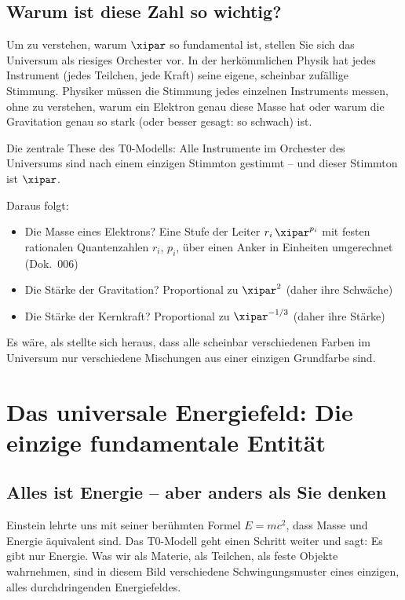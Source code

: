 	\subsection{Warum ist diese Zahl so wichtig?}
	
	Um zu verstehen, warum $\xipar$ so fundamental ist, stellen Sie sich das Universum als riesiges Orchester vor. In der herkömmlichen Physik hat jedes Instrument (jedes Teilchen, jede Kraft) seine eigene, scheinbar zufällige Stimmung. Physiker müssen die Stimmung jedes einzelnen Instruments messen, ohne zu verstehen, warum ein Elektron genau diese Masse hat oder warum die Gravitation genau so stark (oder besser gesagt: so schwach) ist.
	
	\begin{important}
		Die zentrale These des T0-Modells: Alle Instrumente im Orchester des Universums sind nach einem einzigen Stimmton gestimmt -- und dieser Stimmton ist $\xipar$. 
		
		Daraus folgt:
		\begin{itemize}
			\item Die Masse eines Elektrons? Eine Stufe der Leiter $r_i\,\xipar^{p_i}$ mit festen rationalen Quantenzahlen $r_i$, $p_i$, über einen Anker in Einheiten umgerechnet (Dok.~006)
			\item Die Stärke der Gravitation? Proportional zu $\xipar^2$ (daher ihre Schwäche)
			\item Die Stärke der Kernkraft? Proportional zu $\xipar^{-1/3}$ (daher ihre Stärke)
		\end{itemize}
	\end{important}
	
	Es wäre, als stellte sich heraus, dass alle scheinbar verschiedenen Farben im Universum nur verschiedene Mischungen aus einer einzigen Grundfarbe sind.
	
	\section{Das universale Energiefeld: Die einzige fundamentale Entität}
	
	\subsection{Alles ist Energie -- aber anders als Sie denken}
	
	Einstein lehrte uns mit seiner berühmten Formel $E = mc^2$, dass Masse und Energie äquivalent sind. Das T0-Modell geht einen Schritt weiter und sagt: Es gibt nur Energie. Was wir als Materie, als Teilchen, als feste Objekte wahrnehmen, sind in diesem Bild verschiedene Schwingungsmuster eines einzigen, alles durchdringenden Energiefeldes.
	
